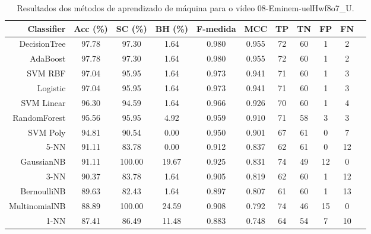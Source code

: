 \begin{table}[!htb]
\centering
\caption{Resultados dos métodos de aprendizado de máquina para o vídeo 08-Eminem-uelHwf8o7_U.}
\label{tab:08-Eminem-uelHwf8o7_U}
\begin{tabular}{r|c|c|c|c|c|c|c|c|c|c}
\hline\hline
Classifier & Acc (\%) & SC (\%) & BH (\%) & F-medida & MCC & TP & TN & FP & FN \\ \hline
DecisionTree & 97.78 & 97.30 & 1.64 & 0.980 & 0.955 & 72 & 60 & 1 & 2 \\ 
AdaBoost & 97.78 & 97.30 & 1.64 & 0.980 & 0.955 & 72 & 60 & 1 & 2 \\ 
SVM RBF & 97.04 & 95.95 & 1.64 & 0.973 & 0.941 & 71 & 60 & 1 & 3 \\ 
Logistic & 97.04 & 95.95 & 1.64 & 0.973 & 0.941 & 71 & 60 & 1 & 3 \\ 
SVM Linear & 96.30 & 94.59 & 1.64 & 0.966 & 0.926 & 70 & 60 & 1 & 4 \\ 
RandomForest & 95.56 & 95.95 & 4.92 & 0.959 & 0.910 & 71 & 58 & 3 & 3 \\ 
SVM Poly & 94.81 & 90.54 & 0.00 & 0.950 & 0.901 & 67 & 61 & 0 & 7 \\ 
5-NN & 91.11 & 83.78 & 0.00 & 0.912 & 0.837 & 62 & 61 & 0 & 12 \\ 
GaussianNB & 91.11 & 100.00 & 19.67 & 0.925 & 0.831 & 74 & 49 & 12 & 0 \\ 
3-NN & 90.37 & 83.78 & 1.64 & 0.905 & 0.819 & 62 & 60 & 1 & 12 \\ 
BernoulliNB & 89.63 & 82.43 & 1.64 & 0.897 & 0.807 & 61 & 60 & 1 & 13 \\ 
MultinomialNB & 88.89 & 100.00 & 24.59 & 0.908 & 0.792 & 74 & 46 & 15 & 0 \\ 
1-NN & 87.41 & 86.49 & 11.48 & 0.883 & 0.748 & 64 & 54 & 7 & 10 \\ 
\hline\hline
\end{tabular}
\end{table}
